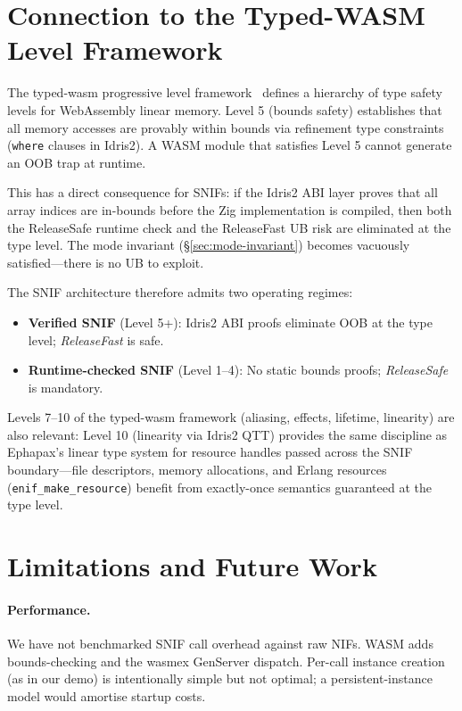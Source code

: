 \documentclass[11pt,a4paper]{article}
\begin{document}
\section{Connection to the Typed-WASM Level Framework}
\label{sec:typed-wasm}

The typed-wasm progressive level framework~\cite{jewell2026typedwasm} defines
a hierarchy of type safety levels for WebAssembly linear memory. Level 5
(bounds safety) establishes that all memory accesses are provably within bounds
via refinement type constraints (\texttt{where} clauses in Idris2). A WASM
module that satisfies Level 5 cannot generate an OOB trap at runtime.

This has a direct consequence for SNIFs: if the Idris2 ABI layer proves that
all array indices are in-bounds before the Zig implementation is compiled,
then both the ReleaseSafe runtime check and the ReleaseFast UB risk are
eliminated at the type level. The mode invariant (\S\ref{sec:mode-invariant})
becomes vacuously satisfied---there is no UB to exploit.

The SNIF architecture therefore admits two operating regimes:

\begin{itemize}
  \item \textbf{Verified SNIF} (Level 5+): Idris2 ABI proofs eliminate OOB at
        the type level; \textit{ReleaseFast} is safe.
  \item \textbf{Runtime-checked SNIF} (Level 1--4): No static bounds proofs;
        \textit{ReleaseSafe} is mandatory.
\end{itemize}

Levels 7--10 of the typed-wasm framework (aliasing, effects, lifetime,
linearity) are also relevant: Level 10 (linearity via Idris2 QTT) provides
the same discipline as Ephapax's linear type system for resource handles
passed across the SNIF boundary---file descriptors, memory allocations, and
Erlang resources (\texttt{enif\_make\_resource}) benefit from exactly-once
semantics guaranteed at the type level.

\section{Limitations and Future Work}

\paragraph{Performance.}
We have not benchmarked SNIF call overhead against raw NIFs. WASM adds
bounds-checking and the wasmex GenServer dispatch. Per-call instance creation
(as in our demo) is intentionally simple but not optimal; a persistent-instance
model would amortise startup costs.
\end{document}
